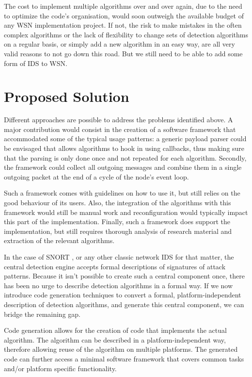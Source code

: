 \documentclass[conference]{IEEEtran}
\begin{document}
The cost to implement multiple algorithms over and over again, due to the need
to optimize the code's organisation, would soon outweigh the available budget
of any WSN implementation project. If not, the risk to make mistakes in the
often complex algorithms or the lack of flexibility to change sets of detection
algorithms on a regular basis, or simply add a new algorithm in an easy way,
are all very valid reasons to not go down this road. But we still need to be
able to add some form of IDS to WSN.

\section{Proposed Solution}
\label{section:solution}

Different approaches are possible to address the problems identified above. A
major contribution would consist in the creation of a software framework that
accommodated some of the typical usage patterns: a generic payload parser could
be envisaged that allows algorithms to hook in using callbacks, thus making
sure that the parsing is only done once and not repeated for each algorithm.
Secondly, the framework could collect all outgoing messages and combine them in
a single outgoing packet at the end of a cycle of the node's event loop.

Such a framework comes with guidelines on how to use it, but still relies on
the good behaviour of its users. Also, the integration of the algorithms with
this framework would still be manual work and reconfiguration would typically
impact this part of the implementation. Finally, such a framework does support
the implementation, but still requires thorough analysis of research material
and extraction of the relevant algorithms.

In the case of SNORT \cite{roesch1999snort}, or any other classic network IDS
for that matter, the central detection engine accepts formal descriptions of
signatures of attack patterns. Because it isn't possible to create such a
central component once, there has been no urge to describe detection algorithms
in a formal way. If we now introduce code generation techniques to convert a
formal, platform-independent description of detection algorithms, and generate
this central component, we can bridge the remaining gap.

Code generation allows for the creation of code that implements the actual
algorithm. The algorithm can be described in a platform-independent way,
therefore allowing reuse of the algorithm on multiple platforms. The generated
code can further access a minimal software framework that covers common tasks
and/or platform specific functionality.
\end{document}
